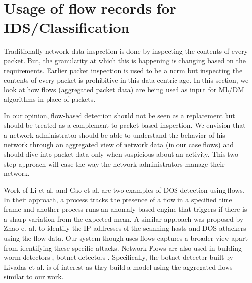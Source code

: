 \section{Usage of flow records for IDS/Classification}

Traditionally network data inspection is done by inspecting the contents of every packet. But, the granularity at which this is happening is changing based on the requirements. Earlier packet inspection is used to be a norm but inspecting the contents of every packet is prohibitive in this data-centric age. In this section, we look at how flows (aggregated packet data) are being used as input for ML/DM algorithms in place of packets.

In our opinion, flow-based detection should not be seen as a replacement but should be treated as a complement to packet-based inspection. We envision that a network administrator should be able to understand the behavior of his network through an aggregated view of network data (in our case flows) and should dive into packet data only when suspicious about an activity. This two-step approach will ease the way the network administrators manage their network.

Work of Li et al. \cite{gao2005towards} and Gao et al. \cite{gao2006resilient} are two examples of DOS detection using flows. In their approach, a process tracks the presence of a flow in a specified time frame and another process runs an anomaly-based engine that triggers if there is a sharp variation from the expected mean. A similar approach was proposed by Zhao et al.\cite{zhao2006detection} to identify the IP addresses of the scanning hosts and DOS attackers using the flow data. Our system though uses flows captures a broader view apart from identifying these specific attacks. Network Flows are also used in building worm detectors \cite{dubendorfer2005framework} \cite{diibendorfer2005host}, botnet detectors \cite{strayer2008botnet} \cite{livadas2006usilng} \cite{karasaridis2007wide}. Specifically, the botnet detector built by Livadas et al.  \cite{livadas2006usilng} is of interest as they  build a model using the aggregated flows similar to our work.